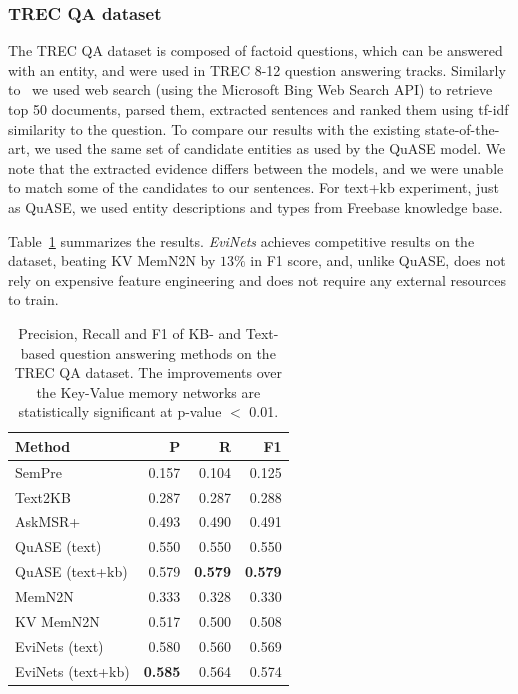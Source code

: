 \subsubsection{TREC QA dataset}
\label{section:factoid:evinet:eval:trecqa}

The TREC QA dataset is composed of factoid questions, which can be answered with an entity, and were used in TREC 8-12 question answering tracks.
Similarly to~\cite{Sun:2015:ODQ:2736277.2741651} we used web search (using the Microsoft Bing Web Search API) to retrieve top 50 documents, parsed them, extracted sentences and ranked them using tf-idf similarity to the question.
To compare our results with the existing state-of-the-art, we used the same set of candidate entities as used by the QuASE model.
We note that the extracted evidence differs between the models, and we were unable to match some of the candidates to our sentences.
For text+kb experiment, just as QuASE, we used entity descriptions and types from Freebase knowledge base.

Table~\ref{table:factoid:evinet:eval:trecqa} summarizes the results.
\textit{EviNets} achieves competitive results on the dataset, beating KV MemN2N by $13\%$ in F1 score, and, unlike QuASE, does not rely on expensive feature engineering and does not require any external resources to train.

\begin{table}
\centering
\begin{tabular}{lrrr}
Method & P & R & F1 \\
\hline
SemPre & 0.157 & 0.104 & 0.125 \\
Text2KB & 0.287 & 0.287 & 0.288 \\
AskMSR+ & 0.493 & 0.490 & 0.491 \\
QuASE (text) & 0.550 & 0.550 & 0.550 \\
QuASE (text+kb) & 0.579 & \textbf{0.579} & \textbf{0.579} \\
\hline
MemN2N & 0.333 & 0.328 & 0.330 \\
KV MemN2N & 0.517 & 0.500 & 0.508 \\
EviNets (text) & 0.580 & 0.560 & 0.569 \\
EviNets (text+kb) & \textbf{0.585} & 0.564 & 0.574 \\
\end{tabular}
\caption{Precision, Recall and F1 of KB- and Text-based question answering methods on the TREC QA dataset. The improvements over the Key-Value memory networks are statistically significant at p-value $<$ 0.01.}
\label{table:factoid:evinet:eval:trecqa}
\end{table}

